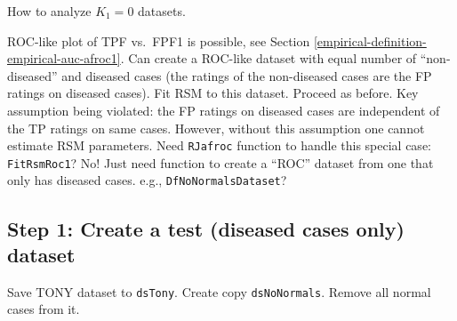 \documentclass[
]{book}
\begin{document}
How to analyze \(K_1 = 0\) datasets.

ROC-like plot of TPF vs.~FPF1 is possible, see Section \ref{empirical-definition-empirical-auc-afroc1}. Can create a ROC-like dataset with equal number of ``non-diseased'' and diseased cases (the ratings of the non-diseased cases are the FP ratings on diseased cases). Fit RSM to this dataset. Proceed as before. Key assumption being violated: the FP ratings on diseased cases are independent of the TP ratings on same cases. However, without this assumption one cannot estimate RSM parameters. Need \texttt{RJafroc} function to handle this special case: \texttt{FitRsmRoc1}? No! Just need function to create a ``ROC'' dataset from one that only has diseased cases. e.g., \texttt{DfNoNormalsDataset}?

\hypertarget{analyze-diseased-only-dataset-step-1}{%
\subsection{Step 1: Create a test (diseased cases only) dataset}\label{analyze-diseased-only-dataset-step-1}}

Save TONY dataset to \texttt{dsTony}. Create copy \texttt{dsNoNormals}. Remove all normal cases from it.
\end{document}
